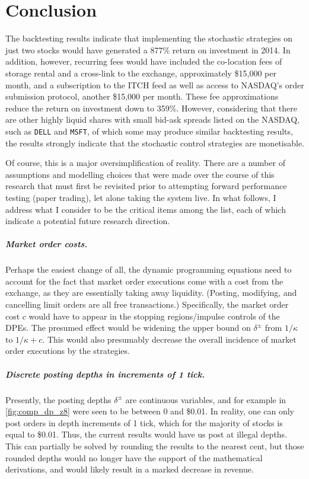 \chapter{Conclusion}

The backtesting results indicate that implementing the stochastic strategies on just two stocks would have generated a 877\% return on investment in 2014. In addition, however, recurring fees would have included the co-location fees of storage rental and a cross-link to the exchange, approximately \$15,000 per month, and a subscription to the ITCH feed as well as access to NASDAQ's order submission protocol, another \$15,000 per month. These fee approximations reduce the return on investment down to 359\%. However, considering that there are other highly liquid shares with small bid-ask spreads listed on the NASDAQ, such as \texttt{DELL} and \texttt{MSFT}, of which some may produce similar backtesting results, the results strongly indicate that the stochastic control strategies are monetisable.

Of course, this is a major oversimplification of reality. There are a number of assumptions and modelling choices that were made over the course of this research that must first be revisited prior to attempting forward performance testing (paper trading), let alone taking the system live. In what follows, I address what I consider to be the critical items among the list, each of which indicate a potential future research direction.

\paragraph{Market order costs.} Perhaps the easiest change of all, the dynamic programming equations need to account for the fact that market order executions come with a cost from the exchange, as they are essentially taking away liquidity. (Posting, modifying, and cancelling limit orders are all free transactions.) Specifically, the market order cost $c$ would have to appear in the stopping regions/impulse controls of the DPEs. The presumed effect would be widening the upper bound on $\delta^\pm$ from $1/\kappa$ to $1/\kappa + c$. This would also presumably decrease the overall incidence of market order executions by the strategies.

\paragraph{Discrete posting depths in increments of 1 tick.} Presently, the posting depths $\delta^\pm$ are continuous variables, and for example in \autoref{fig:comp_dp_z8} were seen to be between 0 and \$0.01. In reality, one can only post orders in depth increments of 1 tick, which for the majority of stocks is equal to \$0.01. Thus, the current results would have us post at illegal depths. This can partially be solved by rounding the results to the nearest cent, but those rounded depths would no longer have the support of the mathematical derivations, and would likely result in a marked decrease in revenue.

